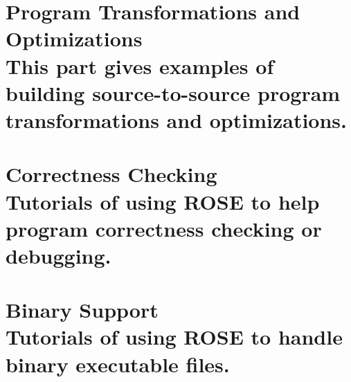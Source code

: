 \documentclass[10pt]{book}
\begin{document}
\part[Program Transformations and Optimizations]{ Program Transformations
and Optimizations \\
\vspace{1.0in}
\normalsize{This part gives examples of building source-to-source program
transformations and optimizations.}
}





%
%
%
%
%










\part[Correctness Checking]{ Correctness Checking \\
\vspace{1.0in}
\normalsize{Tutorials of using ROSE to help program correctness checking or
debugging.}
}




\part[Binary Support]{ Binary Support \\
\vspace{1.0in}
\normalsize{Tutorials of using ROSE to handle binary executable files.}
}




\end{document}
